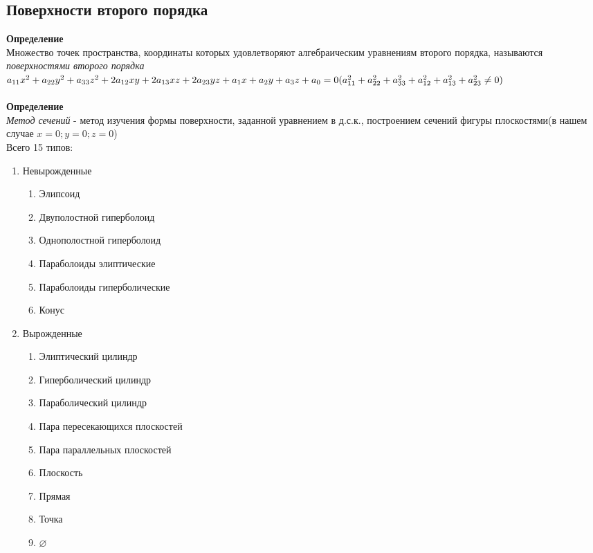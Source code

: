 \documentclass[12pt]{article}
\begin{document}
    \subsection{Поверхности второго порядка}
    \textbf{Определение}\\
    Множество точек пространства, координаты которых удовлетворяют алгебраическим уравнениям второго порядка, называются \textit{поверхностями второго порядка}\\
    $a_{11}x^2+a_{22}y^2+a_{33}z^2+2a_{12}xy+2a_{13}xz+2a_{23}yz+a_1x+a_2y+a_3z+a_0 = 0\\ (a_{11}^2+a_{22}^2+a_{33}^2+a_{12}^2+a_{13}^2+a_{23}^2 \neq 0)$\\\\
    \textbf{Определение}\\
    \textit{Метод сечений} - метод изучения формы поверхности, заданной уравнением в д.с.к., построением сечений фигуры плоскостями(в нашем случае $x=0; y=0; z=0$)\\ 
    Всего 15 типов:
    \begin{enumerate}
        \item Невырожденные
        \begin{enumerate}
            \item Элипсоид
            \item Двуполостной гиперболоид
            \item Однополостной гиперболоид
            \item Параболоиды элиптические
            \item Параболоиды гиперболические
            \item Конус
        \end{enumerate}
        \item Вырожденные
        \begin{enumerate}
            \item Элиптический цилиндр
            \item Гиперболический цилиндр
            \item Параболический цилиндр
            \item Пара пересекающихся плоскостей
            \item Пара параллельных плоскостей
            \item Плоскость
            \item Прямая
            \item Точка
            \item $\varnothing$
        \end{enumerate}
    \end{enumerate}
\end{document}
